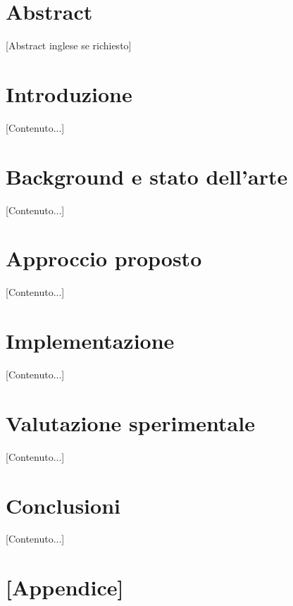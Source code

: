 \documentclass[12pt,a4paper,twoside,openright]{report}
\begin{document}
\chapter*{Abstract}
[Abstract inglese se richiesto]

\tableofcontents
\listoffigures
\listoftables

\chapter{Introduzione}
[Contenuto...]

\chapter{Background e stato dell'arte}
[Contenuto...]

\chapter{Approccio proposto}
[Contenuto...]

\chapter{Implementazione}
[Contenuto...]

\chapter{Valutazione sperimentale}
[Contenuto...]

\chapter{Conclusioni}
[Contenuto...]

\printbibliography[heading=bibintoc, title={Bibliografia}]

\appendix
\chapter{[Appendice]}
\end{document}
